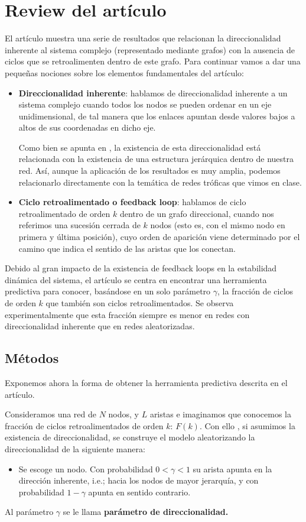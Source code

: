 \documentclass[1p]{elsarticle}
\begin{document}
\section{Review del artículo}
El artículo muestra una serie de resultados que relacionan la direccionalidad inherente al sistema complejo (representado mediante grafos) con la ausencia de ciclos que se retroalimenten dentro de este grafo. 
Para continuar vamos a dar una pequeñas nociones sobre los elementos fundamentales del artículo:
\begin{itemize}
	\item \textbf{Direccionalidad inherente}: hablamos de direccionalidad inherente a un sistema complejo cuando todos los nodos se pueden ordenar en un eje unidimensional, de tal manera que los enlaces apuntan desde valores bajos a altos de sus coordenadas en dicho eje. 
	
	Como bien se apunta en \cite{arti}, la existencia de esta direccionalidad está relacionada con la existencia de una estructura jerárquica dentro de nuestra red. Así, aunque la aplicación de los resultados es muy amplia, podemos relacionarlo directamente con la temática de redes tróficas que vimos en clase. 
	\item \textbf{Ciclo retroalimentado o feedback loop}: hablamos de ciclo retroalimentado de orden $k$ dentro de un grafo direccional, cuando nos referimos una sucesión cerrada de $k$ nodos (esto es, con el mismo nodo en primera y última posición), cuyo orden de aparición viene determinado por el camino que indica el sentido de las aristas que los conectan.

\end{itemize}

Debido al gran impacto de la existencia de feedback loops en la estabilidad dinámica del sistema, el artículo se centra en encontrar una herramienta predictiva para conocer, basándose en un solo parámetro $\gamma$, la fracción de ciclos de orden $k$ que también son ciclos retroalimentados. Se observa experimentalmente que esta fracción siempre es menor en redes con direccionalidad inherente que en redes aleatorizadas.

\subsection{Métodos}
Exponemos ahora la forma de obtener la herramienta predictiva descrita en el artículo.

Consideramos una red de $N$ nodos, y $L$ aristas e imaginamos que conocemos la fracción de ciclos retroalimentados de orden $k$: $F(k)$. Con ello , si asumimos la existencia de direccionalidad, se construye el modelo aleatorizando la direccionalidad de la siguiente manera: 
\begin{itemize}
	\item Se escoge un nodo. Con probabilidad $0<\gamma<1$ su arista apunta en la dirección inherente, i.e.; hacia los nodos de mayor jerarquía, y con probabilidad $1-\gamma$ apunta en sentido contrario.
\end{itemize}
Al parámetro $\gamma$ se le llama \textbf{parámetro de direccionalidad.}
\end{document}
